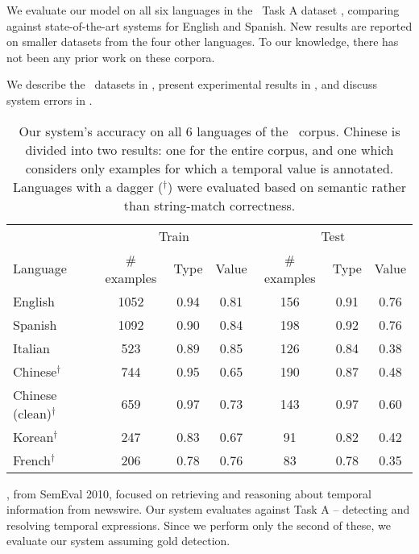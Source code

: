 We evaluate our model on all six languages in the \tempeval\ Task A dataset
  \cite{key:2010verhagen-tempeval}, comparing against state-of-the-art
  systems for English and Spanish.
New results are reported on smaller datasets from the four other languages.
To our knowledge, there has not been any prior work on these corpora.

We describe the \tempeval\ datasets in ,
  present experimental results in ,
  and discuss system errors in .


\begin{table*}[ht]
	\begin{center}
	\begin{tabular}{|l|c|c|c|c|c|c|}
		\hline
		       & \multicolumn{3}{c|}{Train} & \multicolumn{3}{c|}{Test} \\
		Language & \# examples & Type & Value  & \# examples & Type & Value \\
		\hline
		English                        & 1052 & 0.94 & 0.81  & 156 & 0.91 & 0.76 \\
		Spanish                        & 1092 & 0.90 & 0.84  & 198 & 0.92 & 0.76 \\
		Italian                        & 523  & 0.89 & 0.85  & 126 & 0.84 & 0.38 \\
		Chinese$^\dagger$              & 744  & 0.95 & 0.65  & 190 & 0.87 & 0.48 \\
		Chinese (clean)$^\dagger$      & 659  & 0.97 & 0.73  & 143 & 0.97 & 0.60 \\
		Korean$^\dagger$               & 247  & 0.83 & 0.67  & 91  & 0.82 & 0.42 \\
		French$^\dagger$               & 206  & 0.78 & 0.76  & 83  & 0.78 & 0.35 \\
		\hline
	\end{tabular}
	\caption{
    Our system's accuracy on all 6 languages of the \tempeval\ corpus.
    Chinese is divided into two results: one for the entire corpus, and one
      which considers only examples for which a temporal value is annotated.
    Languages with a dagger ($^\dagger$) were evaluated based on semantic
      rather than string-match correctness.
		\label{tab:results-all}
	}
	\end{center}
\end{table*}

\tempeval, from SemEval 2010, focused on retrieving and reasoning
  about temporal information from newswire.
Our system evaluates against Task A -- detecting and resolving temporal
  expressions.
Since we perform only the second of these, we evaluate our system
	assuming gold detection.

